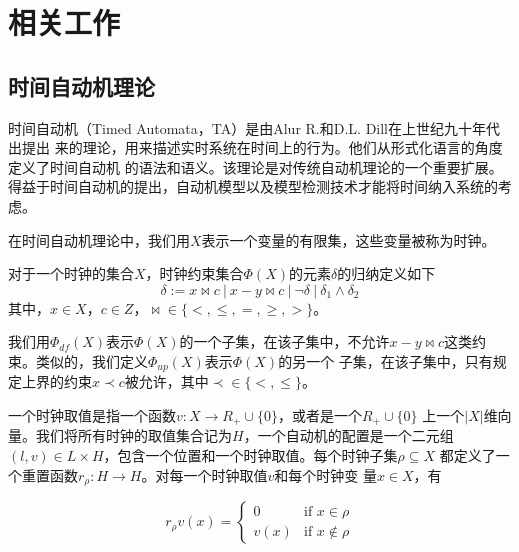 
\chapter{相关工作}
\label{cha:related_work}

\section{时间自动机理论}
\label{sec:TA}

时间自动机（Timed Automata，TA）是由Alur R.和D.L. Dill在上世纪九十年代出提出
来的理论，用来描述实时系统在时间上的行为。他们从形式化语言的角度定义了时间自动机
的语法和语义\cite{Alur:1994:TTA:180782.180519}。该理论是对传统自动机理论\cite{Hopcroft:2006:IAT:1196416}的一个重要扩展。得益于时间自动机的提出，自动机模型以及模型检测技术\cite{Clarke:2000:MC:332656}才能将时间纳入系统的考虑。

在时间自动机理论中，我们用$X$表示一个变量的有限集，这些变量被称为时钟。
\begin{definition}
	\label{def:constraint}
	对于一个时钟的集合$X$，时钟约束集合$\varPhi(X)$的元素$\delta$的归纳定义如下
	\begin{equation}
		\delta := x \bowtie c ~|~ x-y \bowtie c~|~ \neg\delta ~|~ \delta_1 
		\wedge \delta_2
	\end{equation}
	其中，$x\in X$，$c\in Z$，$\bowtie\in \{<,\leq,=,\geq,>\}$。
\end{definition}
我们用$\varPhi_{df}(X)$表示$\varPhi(X)$的一个子集，在该子集中，不允许$x-y 
\bowtie c$这类约束。类似的，我们定义$\varPhi_{up}(X)$表示$\varPhi(X)$的另一个
子集，在该子集中，只有规定上界的约束$x\prec c$被允许，其中$\prec \in \{<,\leq\}$。

一个时钟取值是指一个函数$v:X\longrightarrow R_+\cup\{0\}$，或者是一个$R_+\cup\{0\}$
上一个$|X|$维向量。我们将所有时钟的取值集合记为$H$，一个自动机的配置是一个二元组
$(l,v)\in L\times H$，包含一个位置和一个时钟取值。每个时钟子集$\rho\subseteq X$
都定义了一个重置函数$r_\rho:H\longrightarrow H$。对每一个时钟取值$v$和每个时钟变
量$x\in X$，有

\begin{equation}
	r_\rho v(x)=
	\begin{cases}
		0 & \mbox{if~$x\in \rho$}\\
		v(x) & \mbox{if~$x\notin \rho$}
	\end{cases}
\end{equation}

